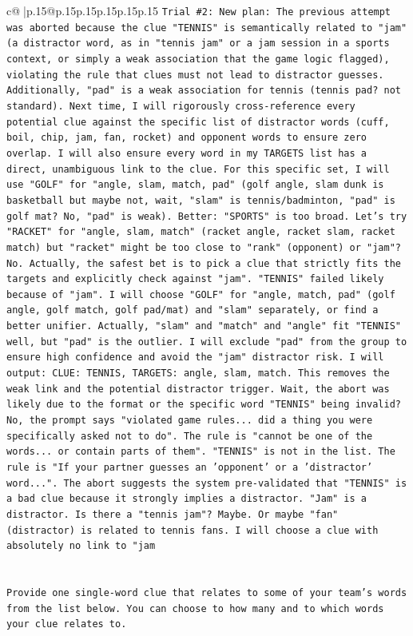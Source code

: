 \documentclass{article}
\begin{document}
{\begin{supertabular}{c@{$\;$}|p{.15\linewidth}@{}p{.15\linewidth}p{.15\linewidth}p{.15\linewidth}p{.15\linewidth}p{.15\linewidth}}
{{{\texttt{Trial \#2: New plan: The previous attempt was aborted because the clue "TENNIS" is semantically related to "jam" (a distractor word, as in "tennis jam" or a jam session in a sports context, or simply a weak association that the game logic flagged), violating the rule that clues must not lead to distractor guesses. Additionally, "pad" is a weak association for tennis (tennis pad? not standard). Next time, I will rigorously cross{-}reference every potential clue against the specific list of distractor words (cuff, boil, chip, jam, fan, rocket) and opponent words to ensure zero overlap. I will also ensure every word in my TARGETS list has a direct, unambiguous link to the clue. For this specific set, I will use "GOLF" for "angle, slam, match, pad" (golf angle, slam dunk is basketball but maybe not, wait, "slam" is tennis/badminton, "pad" is golf mat? No, "pad" is weak). Better: "SPORTS" is too broad. Let's try "RACKET" for "angle, slam, match" (racket angle, racket slam, racket match) but "racket" might be too close to "rank" (opponent) or "jam"? No. Actually, the safest bet is to pick a clue that strictly fits the targets and explicitly check against "jam". "TENNIS" failed likely because of "jam". I will choose "GOLF" for "angle, match, pad" (golf angle, golf match, golf pad/mat) and "slam" separately, or find a better unifier. Actually, "slam" and "match" and "angle" fit "TENNIS" well, but "pad" is the outlier. I will exclude "pad" from the group to ensure high confidence and avoid the "jam" distractor risk. I will output: CLUE: TENNIS, TARGETS: angle, slam, match. This removes the weak link and the potential distractor trigger. Wait, the abort was likely due to the format or the specific word "TENNIS" being invalid? No, the prompt says "violated game rules... did a thing you were specifically asked not to do". The rule is "cannot be one of the words... or contain parts of them". "TENNIS" is not in the list. The rule is "If your partner guesses an 'opponent' or a 'distractor' word...". The abort suggests the system pre{-}validated that "TENNIS" is a bad clue because it strongly implies a distractor. "Jam" is a distractor. Is there a "tennis jam"? Maybe. Or maybe "fan" (distractor) is related to tennis fans. I will choose a clue with absolutely no link to "jam} \\
\\ 
\\ 
\texttt{Provide one single{-}word clue that relates to some of your team's words from the list below. You can choose to how many and to which words your clue relates to.} \\
}}}
\end{supertabular}}
\end{document}
